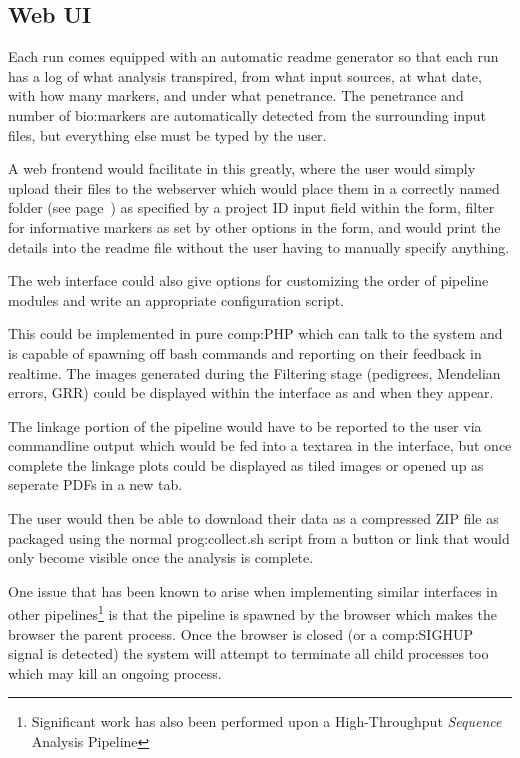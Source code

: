 \subsection{Web UI}

Each run comes equipped with an automatic readme generator so that each run has a log of what analysis transpired, from what input sources, at what date, with how many markers, and under what penetrance. The penetrance and number of \gls{bio:markers} are automatically detected from the surrounding input files, but everything else must be typed by the user.

A web frontend would facilitate in this greatly, where the user would simply upload their files to the webserver which would place them in a correctly named folder (see page~\pageref{ref:meth:foldconv}) as specified by a project ID input field within the form, filter for informative markers as set by other options in the form, and would print the details into the readme file without the user having to manually specify anything.

The web interface could also give options for customizing the order of pipeline modules and write an appropriate configuration script.

This could be implemented in pure \gls{comp:PHP} \cite{bakken2000php} which can talk to the system and is capable of spawning off bash commands and reporting on their feedback in realtime. The images generated during the Filtering stage (pedigrees, Mendelian errors, GRR) could be displayed within the interface as and when they appear.

The linkage portion of the pipeline would have to be reported to the user via commandline output which would be fed into a textarea in the interface, but once complete the linkage plots could be displayed as tiled images or opened up as seperate PDFs in a new tab.

The user would then be able to download their data as a compressed ZIP file as packaged using the normal \gls{prog:collect.sh} script from a button or link that would only become visible once the analysis is complete.

One issue that has been known to arise when implementing similar interfaces in other pipelines\footnote{Significant work has also been performed upon a High-Throughput \textit{Sequence} Analysis Pipeline} is that the pipeline is spawned by the browser which makes the browser the parent process. Once the browser is closed (or a \gls{comp:SIGHUP} signal is detected) the system will attempt to terminate all child processes too which may kill an ongoing process.

